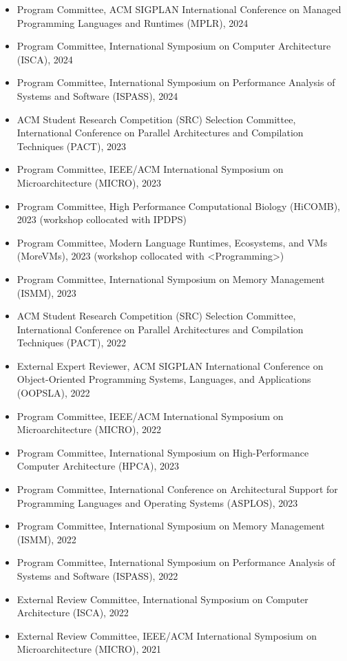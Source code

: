 \documentclass[singlecolumn,singlespace,11pt]{article}
\begin{document}
\begin{itemize}
\item Program Committee, ACM SIGPLAN International Conference on Managed Programming Languages and Runtimes (MPLR), 2024
\item Program Committee, International Symposium on Computer Architecture (ISCA), 2024
\item Program Committee, International Symposium on Performance Analysis of Systems and Software (ISPASS), 2024
\item ACM Student Research Competition (SRC) Selection Committee, International Conference on Parallel Architectures and Compilation Techniques (PACT), 2023
\item Program Committee, IEEE/ACM International Symposium on Microarchitecture (MICRO), 2023
\item Program Committee, High Performance Computational Biology (HiCOMB), 2023 (workshop collocated with IPDPS)
\item Program Committee, Modern Language Runtimes, Ecosystems, and VMs (MoreVMs), 2023 (workshop collocated with <Programming>) 
\item Program Committee, International Symposium on Memory Management (ISMM), 2023
\item ACM Student Research Competition (SRC) Selection Committee, International Conference on Parallel Architectures and Compilation Techniques (PACT), 2022
\item External Expert Reviewer, ACM SIGPLAN International Conference on Object-Oriented Programming Systems, Languages, and Applications (OOPSLA), 2022
\item Program Committee, IEEE/ACM International Symposium on Microarchitecture (MICRO), 2022
\item Program Committee, International Symposium on High-Performance Computer Architecture (HPCA), 2023
\item Program Committee, International Conference on Architectural Support for Programming Languages and Operating Systems (ASPLOS), 2023
\item Program Committee, International Symposium on Memory Management (ISMM), 2022
\item Program Committee, International Symposium on Performance Analysis of Systems and Software (ISPASS), 2022
\item External Review Committee, International Symposium on Computer Architecture (ISCA), 2022
\item External Review Committee, IEEE/ACM International Symposium on Microarchitecture (MICRO), 2021

\end{itemize}
\end{document}
